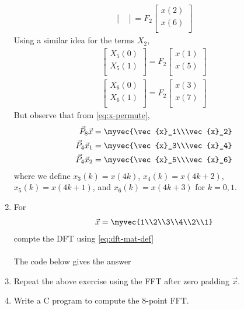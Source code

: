 \documentclass[journal,12pt,twocolumn]{IEEEtran}
\renewcommand\thesection{\arabic{section}}
\begin{document}
\begin{enumerate}[label=\arabic*.,ref=\thesection.\theenumi]
\begin{align}
\begin{bmatrix}
\end{bmatrix}
= F_{2}
\begin{bmatrix}
x(2) \\ 
x(6) \\ 
\end{bmatrix}
\end{align}
Using a similar idea for the terms $X_2$, 
\begin{align}
\begin{bmatrix}
X_{5}(0) \\ 
X_{5}(1)\\ 
\end{bmatrix}
= F_{2}
\begin{bmatrix}
x(1) \\ 
x(5) \\ 
\end{bmatrix} \\
\begin{bmatrix}
X_{6}(0) \\ 
X_{6}(1)\\ 
\end{bmatrix}
= F_{2}
\begin{bmatrix}
x(3) \\ 
x(7) \\ 
\end{bmatrix}
\end{align}
But observe that from \eqref{eq:x-permute},
\begin{align}
	\vec{P}_8\vec{x} &= \myvec{\vec{x}_1\\\vec{x}_2} \\
	\vec{P}_4\vec{x}_1 &= \myvec{\vec{x}_3\\\vec{x}_4} \\ 
	\vec{P}_4\vec{x}_2 &= \myvec{\vec{x}_5\\\vec{x}_6}
\end{align}
where we define $x_3(k) = x(4k)$, $x_4(k) = x(4k + 2)$, $x_5(k) = x(4k + 1)$, and $x_6(k) = x(4k + 3)$ for $k = 0, 1$.
\item For 
    \begin{align}
	    \vec{x} = \myvec{1\\2\\3\\4\\2\\1}
        \label{eq:equation1}
    \end{align}
    compte the DFT  
		using 
	    \eqref{eq:dft-mat-def}\\
\solution\\
The code below gives the answer

\item Repeat the above exercise using the FFT
	    after zero padding $\vec{x}$.
\item Write a C program to compute the 8-point FFT. \\
\solution\\

\end{enumerate}
%
\end{document}
